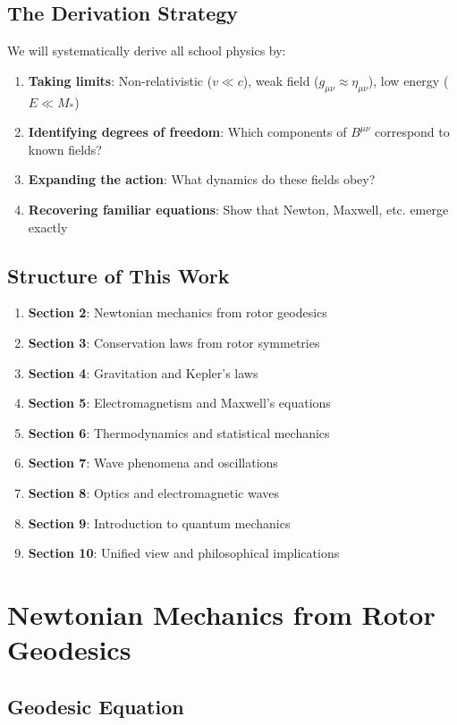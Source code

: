 \documentclass[12pt,a4paper]{article}
\theoremstyle{definition}
\theoremstyle{remark}
\begin{document}
\subsection{The Derivation Strategy}

We will systematically derive all school physics by:
\begin{enumerate}
\item \textbf{Taking limits}: Non-relativistic ($v \ll c$), weak field ($g_{\mu\nu} \approx \eta_{\mu\nu}$), low energy ($E \ll M_*$)
\item \textbf{Identifying degrees of freedom}: Which components of $B^{\mu\nu}$ correspond to known fields?
\item \textbf{Expanding the action}: What dynamics do these fields obey?
\item \textbf{Recovering familiar equations}: Show that Newton, Maxwell, etc. emerge exactly
\end{enumerate}

\subsection{Structure of This Work}

\begin{enumerate}
\item \textbf{Section 2}: Newtonian mechanics from rotor geodesics
\item \textbf{Section 3}: Conservation laws from rotor symmetries
\item \textbf{Section 4}: Gravitation and Kepler's laws
\item \textbf{Section 5}: Electromagnetism and Maxwell's equations
\item \textbf{Section 6}: Thermodynamics and statistical mechanics
\item \textbf{Section 7}: Wave phenomena and oscillations
\item \textbf{Section 8}: Optics and electromagnetic waves
\item \textbf{Section 9}: Introduction to quantum mechanics
\item \textbf{Section 10}: Unified view and philosophical implications
\end{enumerate}

\section{Newtonian Mechanics from Rotor Geodesics}

\subsection{Geodesic Equation}
\end{document}
